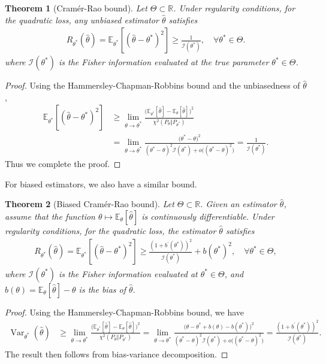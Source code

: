 \documentclass{article}
\numberwithin{equation}{section}
\newcommand{\E}{\mathbb{E}}
\newcommand{\bbR}{\mathbb{R}}
\renewcommand{\cal}{\mathcal}
\newcommand{\wh}{\widehat}
\DeclareMathOperator{\var}{Var}
\theoremstyle{plain}
\newtheorem{theorem}{Theorem}[section]
\theoremstyle{definition}
\begin{document}
\begin{theorem}[Cramér-Rao bound]
Let $\Theta\subset\bbR$. Under regularity conditions, for the quadratic loss, any unbiased estimator $\wh\theta$ satisfies
\begin{align*}
	R_{\theta^*}(\wh{\theta})=\E_{\theta^*}[(\wh{\theta}-\theta^*)^2]\geq\frac{1}{\cal{I}(\theta^*)},\quad\forall\theta^*\in\Theta.
\end{align*}
where $\cal{I}(\theta^*)$ is the Fisher information evaluated at the true parameter $\theta^*\in\Theta$.
\end{theorem}
\begin{proof}
Using the Hammersley-Chapman-Robbins bound and the unbiasedness of $\wh\theta$,
\begin{align*}
	\E_{\theta^*}[(\wh{\theta}-\theta^*)^2]&\geq\lim_{\theta\to\theta^*}\frac{\bigl(\E_{\theta^*}[\wh{\theta}]-\E_{\theta}[\wh{\theta}]\bigr)^2}{\chi^2(P_\theta\Vert P_{\theta^*})}\\
	&=\lim_{\theta\to\theta^*}\frac{\bigl(\theta^*-\theta\bigr)^2}{(\theta^*-\theta)^2\cal{I}(\theta^*)+o\bigl((\theta^*-\theta)^2\bigr)}=\frac{1}{\cal{I}(\theta^*)}.
\end{align*}
Thus we complete the proof.
\end{proof}

For biased estimators, we also have a similar bound.

\newpage
\begin{theorem}[Biased Cramér-Rao bound]\label{biasedcramerrao}
Let $\Theta\subset\bbR$. Given an estimator $\wh\theta$, assume that the function $\theta\mapsto\E_\theta[\wh\theta]$ is continuously differentiable. Under regularity conditions, for the quadratic loss, the estimator $\wh\theta$ satisfies
	\begin{align*}
		R_{\theta^*}(\wh{\theta})=\E_{\theta^*}[(\wh{\theta}-\theta^*)^2]\geq\frac{(1+b^\prime(\theta^*))^2}{\cal{I}(\theta^*)}+b(\theta^*)^2,\quad\forall\theta^*\in\Theta,
	\end{align*}
	where $\cal{I}(\theta^*)$ is the Fisher information evaluated at  $\theta^*\in\Theta$, and $b(\theta)=\E_\theta[\wh{\theta}]-\theta$ is the bias of $\wh\theta$.
\end{theorem}
\begin{proof}
Using the Hammersley-Chapman-Robbins bound, we have
\begin{align*}
	\var_{\theta^*}(\wh{\theta})&\geq\lim_{\theta\to\theta^*}\frac{\bigl(\E_{\theta^*}[\wh{\theta}]-\E_{\theta}[\wh{\theta}]\bigr)^2}{\chi^2(P_\theta\Vert P_{\theta^*})}=\lim_{\theta\to\theta^*}\frac{\bigl(\theta-\theta^*+b(\theta)-b(\theta^*)\bigr)^2}{(\theta^*-\theta)^2\cal{I}(\theta^*)+o\bigl((\theta^*-\theta)^2\bigr)}=\frac{(1+b^\prime(\theta^*))^2}{\cal{I}(\theta^*)}.
\end{align*}
The result then follows from bias-variance decomposition.
\end{proof}
\end{document}
